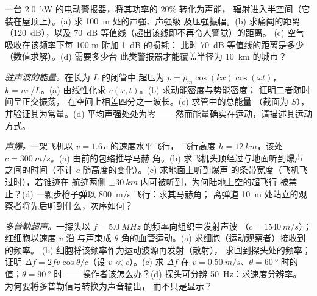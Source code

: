 \begin{exercise}[$\star\star$]\label{exo:b2:sound-waves:9}
一台 \qty{2.0}{kW} 的电动警报器，将其功率的 $20\%$ 转化为声能，
辐射进入半空间（它装在屋顶上）。(a) 求 \qty{100}{m} 处的声强、声强级
及压强振幅。(b) 求痛阈的距离
（\qty{120}{dB}），以及 \qty{70}{dB} 等值线（超出该线即不再令人警觉）的距离。
(c) 空气吸收在该频率下每 100 m 附加 \qty{1}{dB} 的损耗：
此时 \qty{70}{dB} 等值线的距离是多少（数值求解）。(d) 需要多少台
此类警报器才能覆盖半径为 \qty{10}{km} 的城市？
\end{exercise}

\begin{exercise}[$\star\star\star$]\label{exo:b2:sound-waves:10}
\emph{驻声波的能量。}在长为 $L$ 的闭管中
超压为 $p = p_m\cos(kx)\cos(\omega t)$，$k = n\pi/L$。(a) 由线性化求 $v(x,
t)$。(b) 求动能密度与势能密度；
证明二者随时间呈正交振荡，
在空间上相差四分之一波长。(c) 求管中的总能量
（截面为 $S$），并验证其为常量。(d) 平均声强处处为零——
然而能量确实在运动，请描述其运动方式。
\end{exercise}

\begin{exercise}[$\star\star\star$]\label{exo:b2:sound-waves:11}
\emph{声爆。}一架飞机以 $v = 1.6\,c$ 的速度水平飞行，
飞行高度 $h = \qty{12}{km}$，该处 $c = \qty{300}{m/s}$。(a) 由前的包络推导马赫
角。(b) 求飞机头顶经过与地面听到爆声
之间的时间（不计
$c$ 随高度的变化）。(c) 求地面上听到爆声
的条带宽度（飞机飞过时），若锥迹在
航迹两侧 $\pm\qty{30}{km}$ 内可被听到，为何陆地上空的超飞行
被禁止？(d) 一颗步枪子弹以 \qty{800}{m/s} 飞行：求其马赫角；
离弹道 \qty{10}{m} 处站立的观察者将先后听到什么，次序如何？
\end{exercise}

\begin{exercise}[$\star\star\star$]\label{exo:b2:sound-waves:12}
\emph{多普勒超声。}一探头以 $f = \qty{5.0}{MHz}$ 的频率向组织中发射声波
（$c = \qty{1540}{m/s}$）；红细胞以速度 $v$ 沿
与声束成 $\theta$ 角的血管运动。(a) 求细胞（运动观察者）接收到的频率。
(b) 细胞将该频率作为运动波源再发射（散射），
求回到探头处的频率；证明 $\Delta f = 2fv\cos\theta/c$（设 $v \ll c$）。(c)
求 $\Delta f$ 在 $v = \qty{0.50}{m/s}$、$\theta = \qty{60}{\degree}$ 时的值；$\theta = \qty{90}{\degree}$ 时
——操作者该怎么办？(d) 探头可分辨 \qty{50}{Hz}：求速度分辨率。
为何要将多普勒信号转换为声音输出，
而不只是显示？
\end{exercise}


